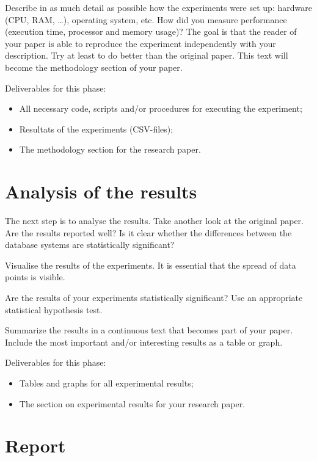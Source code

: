 \documentclass[fleqn,10pt]{artikeltin}
\begin{document}
Describe in as much detail as possible how the experiments were set up: hardware (CPU, RAM, \ldots), operating system, etc. How did you measure performance (execution time, processor and memory usage)? The goal is that the reader of your paper is able to reproduce the experiment independently with your description. Try at least to do better than the original paper. This text will become the methodology section of your paper.

Deliverables for this phase:

\begin{itemize}
	\item All necessary code, scripts and/or procedures for executing the experiment;
	\item Resultats of the experiments (CSV-files);
	\item The methodology section for the research paper.
\end{itemize}

\section{Analysis of the results}
\label{sec:analysis}

The next step is to analyse the results. Take another look at the original paper. Are the results reported well? Is it clear whether the differences between the database systems are statistically significant?

Visualise the results of the experiments. It is essential that the spread of data points is visible.

Are the results of your experiments statistically significant? Use an appropriate statistical hypothesis test.

Summarize the results in a continuous text that becomes part of your paper. Include the most important and/or interesting results as a table or graph.

Deliverables for this phase:

\begin{itemize}
	\item Tables and graphs for all experimental results;
	\item The section on experimental results for your research paper.
\end{itemize}

\section{Report}
\label{sec:report}
\end{document}
